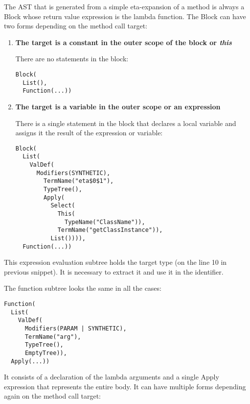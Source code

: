 The AST that is generated from a simple eta-expansion of a method is always a Block whose return value expression is the lambda function. The Block can have two forms depending on the method call target:

\begin{enumerate}
	\item \textbf{The target is a constant in the outer scope of the block or \textit{this}}
	
	There are no statements in the block:
\begin{lstlisting}
Block(
  List(), 
  Function(...))
\end{lstlisting}
	\item \textbf{The target is a variable in the outer scope or an expression}
	
	There is a single statement in the block that declares a local variable and assigns it the result of the expression or variable:
	
\begin{lstlisting}
Block(
  List(
    ValDef(
      Modifiers(SYNTHETIC), 
        TermName("eta$0$1"), 
        TypeTree(), 
        Apply(
          Select(
            This(
              TypeName("ClassName")), 
            TermName("getClassInstance")), 
          List()))), 
  Function(...))
\end{lstlisting}
\end{enumerate}

This expression evaluation subtree holds the target type (on the line 10 in previous snippet). It is necessary to extract it and use it in the identifier.

The function subtree looks the same in all the cases:

\begin{lstlisting}
Function(
  List(
    ValDef(
      Modifiers(PARAM | SYNTHETIC), 
      TermName("arg"), 
      TypeTree(), 
      EmptyTree)), 
  Apply(...))
\end{lstlisting}

It consists of a declaration of the lambda arguments and a single Apply expression that represents the entire body. It can have multiple forms depending again on the method call target:

